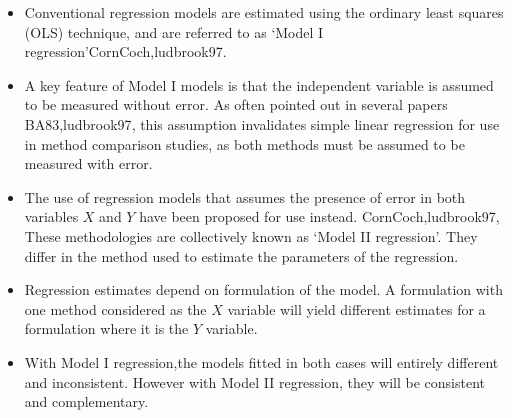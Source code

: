 \documentclass[compress]{beamer}        %
\begin{document}
\begin{frame}
\begin{itemize}
\item Conventional regression models are estimated using the ordinary
least squares (OLS) technique, and are referred to as `Model I
regression'\alert{CornCoch,ludbrook97}. 
\item A key feature of Model I
models is that the independent variable is assumed to be measured
without error. As often pointed out in several papers
\alert{BA83,ludbrook97}, this assumption invalidates simple linear
regression for use in method comparison studies, as both methods
must be assumed to be measured with error.
\end{itemize}

\end{frame}
\begin{frame}
\begin{itemize}
\item
The use of regression models that assumes the presence of error in
both variables $X$ and $Y$ have been proposed for use instead.
\alert{CornCoch,ludbrook97}, These methodologies are collectively
known as `Model II regression'. They differ in the method used to
estimate the parameters of the regression.

\item Regression estimates depend on formulation of the model. A
formulation with one method considered as the $X$ variable will
yield different estimates for a formulation where it is the $Y$
variable. 
\item With Model I regression,the models fitted in both cases
will entirely different and inconsistent. However with Model II
regression, they will be consistent and complementary.
\end{itemize}

\end{frame}


\end{document}
